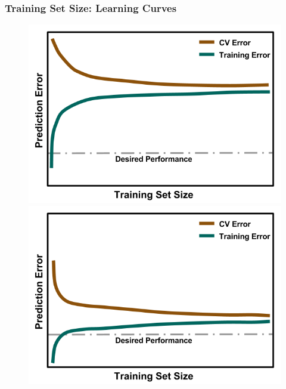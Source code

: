 
\begin{frame}
  \frametitle{Training Set Size: Learning Curves}
  \begin{figure}[h!]
    \centering
    \begin{minipage}{0.35\textwidth}
      \centering
      \includegraphics[width=\linewidth]{./figures/LearningCurve-bias.png}
    \end{minipage}%
    \begin{minipage}{0.35\textwidth}
      \centering
      \includegraphics[width=\linewidth]{./figures/LearningCurve-ideal.png}
    \end{minipage}%
    \begin{minipage}{0.35\textwidth}
      \centering

\end{minipage}
\end{figure}
\end{frame}
